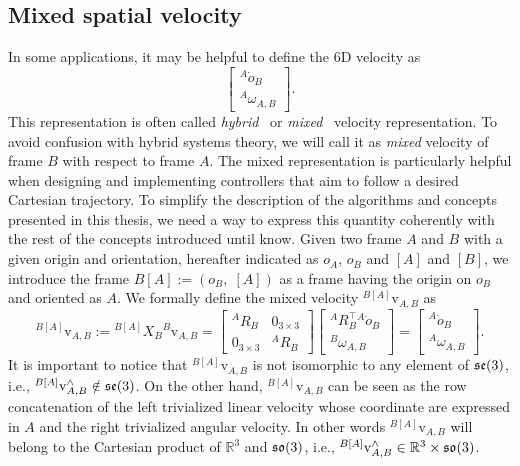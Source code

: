 \subsection{Mixed spatial velocity\label{sec:mixed_spatial_velocity}} 
In some applications, it may be helpful to define the 6D velocity as
\begin{equation}
    \begin{bmatrix}
       {}^A\dot{o}_B \\
       {}^A\omega_{A,B}
    \end{bmatrix}.
\end{equation} 
This representation is often called \emph{hybrid}~\citep{Murray1994} or \emph{mixed}~\citep[Chapter~2.3]{traversaro2017} velocity representation. To avoid confusion with hybrid systems theory, we will call it as \emph{mixed} velocity of frame $B$ with respect to frame $A$. 
The mixed representation is particularly helpful when designing and implementing controllers that aim to follow a desired Cartesian trajectory. 
To simplify the description of the algorithms and concepts presented in this thesis, we need a way to express this quantity coherently with the rest of the concepts introduced until know. Given two frame $A$ and $B$ with a given origin and orientation, hereafter indicated as $o_A$, $o_B$ and $[A]$ and $[B]$, we introduce the frame $B[A]:=(o_B, \; [A])$ as a frame having the origin on $o_B$ and oriented as $A$. We formally define the mixed velocity ${}^{B[A]}\mathrm{v}_{A,B}$ as 
\begin{equation}
\label{eq:mixed_velocity_definition}
    {}^{B[A]}\mathrm{v}_{A,B} := {}^{B[A]} X _B {}^B \mathrm{v} _{A,B} = 
    \begin{bmatrix}
       {}^A R _B & 0_{3\times3} \\
       0_{3\times3} & {}^A R _B
    \end{bmatrix}
    \begin{bmatrix}
       {}^A R _B ^\top {}^A \dot{o}_B\\
       {}^{B}\omega_{A,B}
    \end{bmatrix} = 
    \begin{bmatrix}
       {}^A\dot{o}_B \\
       {}^A\omega_{A,B}
    \end{bmatrix}.
\end{equation}
It is important to notice that ${}^{B[A]}\mathrm{v}_{A,B}$ is not isomorphic to any element of $\mathfrak{se}(3)$, i.e., ${}^{B[A]}\mathrm{v}_{A,B} ^\wedge \notin \mathfrak{se}(3)$. On the other hand, ${}^{B[A]}\mathrm{v}_{A,B}$ can be seen as the row concatenation of the left trivialized linear velocity whose coordinate are expressed in $A$ and the right trivialized angular velocity. In other words ${}^{B[A]}\mathrm{v}_{A,B}$ will belong to the Cartesian product of $\mathbb{R}^3$ and  $\mathfrak{so}(3)$, i.e., ${}^{B[A]}\mathrm{v} ^\wedge _{A,B} \in \mathbb{R}^3 \times \mathfrak{so}(3)$. 

